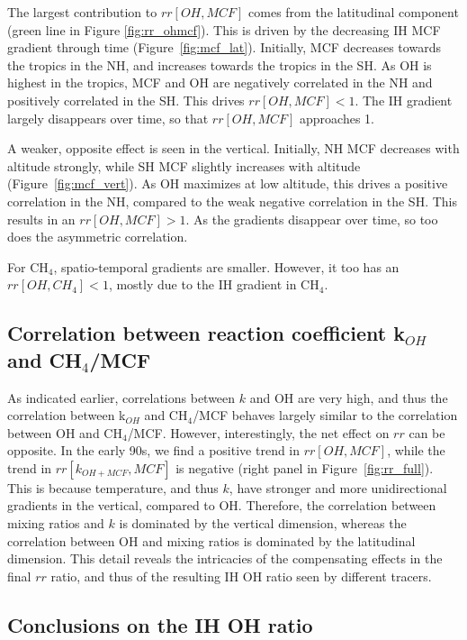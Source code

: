 \documentclass[10pt]{article}
\begin{document}
The largest contribution to $rr[OH,MCF]$ comes from the latitudinal component (green line in Figure \ref{fig:rr_ohmcf}). This is driven by the decreasing IH MCF gradient through time (Figure~\ref{fig:mcf_lat}). Initially, MCF decreases towards the tropics in the NH, and increases towards the tropics in the SH. As OH is highest in the tropics, MCF and OH are negatively correlated in the NH and positively correlated in the SH. This drives $rr[OH,MCF]<1$. The IH gradient largely disappears over time, so that $rr[OH,MCF]$ approaches 1. 

A weaker, opposite effect is seen in the vertical. Initially, NH MCF decreases with altitude strongly, while SH MCF slightly increases with altitude (Figure~\ref{fig:mcf_vert}). As OH maximizes at low altitude, this drives a positive correlation in the NH, compared to the weak negative correlation in the SH. This results in an $rr[OH,MCF]>1$. As the gradients disappear over time, so too does the asymmetric correlation. 

For CH$_4$, spatio-temporal gradients are smaller. However, it too has an $rr[OH,CH_4]<1$, mostly due to the IH gradient in CH$_4$.

\subsection{Correlation between reaction coefficient k$_{OH}$ and CH$_4$/MCF}

As indicated earlier, correlations between $k$ and OH are very high, and thus the correlation between k$_{OH}$ and CH$_4$/MCF behaves largely similar to the correlation between OH and CH$_4$/MCF. However, interestingly, the net effect on $rr$ can be opposite. In the early 90s, we find a positive trend in $rr[OH,MCF]$, while the trend in $rr[k_{OH+MCF},MCF]$ is negative (right panel in Figure~\ref{fig:rr_full}). This is because temperature, and thus $k$, have stronger and more unidirectional gradients in the vertical, compared to OH. Therefore, the correlation between mixing ratios and $k$ is dominated by the vertical dimension, whereas the correlation between OH and mixing ratios is dominated by the latitudinal dimension. This detail reveals the intricacies of the compensating effects in the final $rr$ ratio, and thus of the resulting IH OH ratio seen by different tracers.

\subsection{Conclusions on the IH OH ratio}
\end{document}
